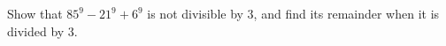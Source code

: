 Show that $85^9-21^9+6^9$ is not divisible by $3$, and find its remainder when it is divided by $3$.
